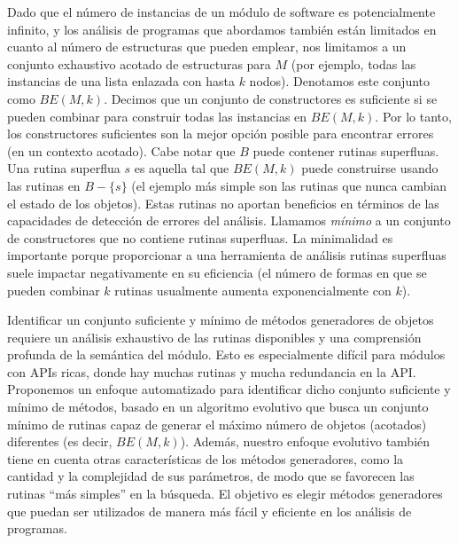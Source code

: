 Dado que el número de instancias de un módulo de software es potencialmente infinito, y los análisis de programas que abordamos también están limitados en cuanto al número de estructuras que pueden emplear, nos limitamos a un conjunto exhaustivo acotado de estructuras para \(M\) \cite{Boyapati02} (por ejemplo, todas las instancias de una lista enlazada con hasta \(k\) nodos). Denotamos este conjunto como \(BE(M, k)\). Decimos que un conjunto de constructores es suficiente si se pueden combinar para construir todas las instancias en \(BE(M, k)\). Por lo tanto, los constructores suficientes son la mejor opción posible para encontrar errores (en un contexto acotado). Cabe notar que \(B\) puede contener rutinas superfluas. Una rutina superflua \(s\) es aquella tal que \(BE(M, k)\) puede construirse usando las rutinas en $B - \{s\}$ (el ejemplo más simple son las rutinas que nunca cambian el estado de los objetos). Estas rutinas no aportan beneficios en términos de las capacidades de detección de errores del análisis. Llamamos \emph{mínimo} a un conjunto de constructores que no contiene rutinas superfluas. La minimalidad es importante porque proporcionar a una herramienta de análisis rutinas superfluas suele impactar negativamente en su eficiencia (el número de formas en que se pueden combinar \(k\) rutinas usualmente aumenta exponencialmente con \(k\)).

Identificar un conjunto suficiente y mínimo de métodos generadores de objetos requiere un análisis exhaustivo de las rutinas disponibles y una comprensión profunda de la semántica del módulo. Esto es especialmente difícil para módulos con APIs ricas, donde hay muchas rutinas y mucha redundancia en la API. Proponemos un enfoque automatizado para identificar dicho conjunto suficiente y mínimo de métodos, basado en un algoritmo evolutivo que busca un conjunto mínimo de rutinas capaz de generar el máximo número de objetos (acotados) diferentes (es decir, \(BE(M, k)\)). Además, nuestro enfoque evolutivo también tiene en cuenta otras características de los métodos generadores, como la cantidad y la complejidad de sus parámetros, de modo que se favorecen las rutinas “más simples” en la búsqueda. El objetivo es elegir métodos generadores que puedan ser utilizados de manera más fácil y eficiente en los análisis de programas.

